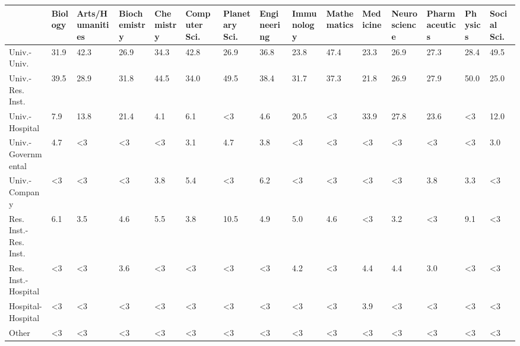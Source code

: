 \begin{tabular}{lllllllllllllll}
\toprule
{} & Biology & Arts/Humanities & Biochemistry & Chemistry & Computer Sci. & Planetary Sci. & Engineering & Immunology & Mathematics & Medicine & Neuroscience & Pharmaceutics & Physics & Social Sci. \\
\midrule
Univ.-Univ.           &    31.9 &            42.3 &         26.9 &      34.3 &          42.8 &           26.9 &        36.8 &       23.8 &        47.4 &     23.3 &         26.9 &          27.3 &    28.4 &        49.5 \\
Univ.-Res. Inst.      &    39.5 &            28.9 &         31.8 &      44.5 &          34.0 &           49.5 &        38.4 &       31.7 &        37.3 &     21.8 &         26.9 &          27.9 &    50.0 &        25.0 \\
Univ.-Hospital        &     7.9 &            13.8 &         21.4 &       4.1 &           6.1 &             <3 &         4.6 &       20.5 &          <3 &     33.9 &         27.8 &          23.6 &      <3 &        12.0 \\
Univ.-Governmental    &     4.7 &              <3 &           <3 &        <3 &           3.1 &            4.7 &         3.8 &         <3 &          <3 &       <3 &           <3 &            <3 &      <3 &         3.0 \\
Univ.-Company         &      <3 &              <3 &           <3 &       3.8 &           5.4 &             <3 &         6.2 &         <3 &          <3 &       <3 &           <3 &           3.8 &     3.3 &          <3 \\
Res. Inst.-Res. Inst. &     6.1 &             3.5 &          4.6 &       5.5 &           3.8 &           10.5 &         4.9 &        5.0 &         4.6 &       <3 &          3.2 &            <3 &     9.1 &          <3 \\
Res. Inst.-Hospital   &      <3 &              <3 &          3.6 &        <3 &            <3 &             <3 &          <3 &        4.2 &          <3 &      4.4 &          4.4 &           3.0 &      <3 &          <3 \\
Hospital-Hospital     &      <3 &              <3 &           <3 &        <3 &            <3 &             <3 &          <3 &         <3 &          <3 &      3.9 &           <3 &            <3 &      <3 &          <3 \\
Other                 &      <3 &              <3 &           <3 &        <3 &            <3 &             <3 &          <3 &         <3 &          <3 &       <3 &           <3 &            <3 &      <3 &          <3 \\
\bottomrule
\end{tabular}
